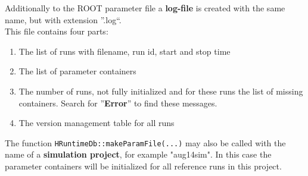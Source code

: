 Additionally to the ROOT parameter file a \textbf{log-file} is created with the same name, but with extension ''.log``.\\
This file contains four parts:
\begin{enumerate}
  \item The list of runs with filename, run id, start and stop time
  \item The list of parameter containers
  \item The number of runs, not fully initialized and for these runs the list of missing containers. Search for 
    ''\textbf{Error}'' to find these messages.
  \item The version management table for all runs
\end{enumerate}

The function \verb+HRuntimeDb::makeParamFile(...)+ may also be called with the name of a \textbf{simulation project}, for 
example "aug14sim". In this case the parameter containers will be initialized for all reference runs in this project.


